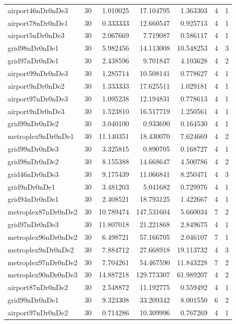 \documentclass[../../../thesis.tex]{subfiles}
\begin{document}
\begin{longtable}{|l|r|r|r|r|r|r|}
airport46nDr0nDe3 & 30 & 1.010025 & 17.104795 & 1.363303 & 4 & 1 \\
airport78nDr0nDe1 & 30 & 0.333333 & 12.660547 & 0.925713 & 4 & 1 \\
airport5nDr0nDe3 & 30 & 2.067669 & 7.719087 & 0.586117 & 4 & 1 \\
grid98nDr0nDe1 & 30 & 5.982456 & 14.113008 & 10.548253 & 4 & 3 \\
grid97nDr0nDe1 & 30 & 2.438596 & 9.701847 & 4.103628 & 4 & 2 \\
airport99nDr0nDe3 & 30 & 1.285714 & 10.508141 & 0.778627 & 4 & 1 \\
airport9nDr0nDe2 & 30 & 1.333333 & 17.625511 & 1.029181 & 4 & 1 \\
airport97nDr0nDe3 & 30 & 1.095238 & 12.194831 & 0.778613 & 4 & 1 \\
airport9nDr0nDe3 & 30 & 1.523810 & 16.517719 & 1.250561 & 4 & 1 \\
grid99nDr0nDe2 & 30 & 3.040100 & 0.933690 & 0.164530 & 4 & 1 \\
metroplex9nDr0nDe1 & 30 & 11.140351 & 18.430070 & 7.624669 & 4 & 2 \\
grid99nDr0nDe3 & 30 & 3.325815 & 0.890705 & 0.168727 & 4 & 1 \\
grid98nDr0nDe2 & 30 & 8.155388 & 14.668647 & 4.500786 & 4 & 2 \\
grid46nDr0nDe3 & 30 & 9.175439 & 11.066841 & 8.250471 & 4 & 3 \\
grid9nDr0nDe1 & 30 & 3.481203 & 5.041682 & 0.729976 & 4 & 1 \\
grid94nDr0nDe1 & 30 & 2.408521 & 18.793125 & 1.422667 & 4 & 1 \\
metroplex87nDr0nDe2 & 30 & 10.789474 & 147.531604 & 5.660034 & 7 & 2 \\
grid97nDr0nDe3 & 30 & 11.807018 & 21.221868 & 2.849675 & 4 & 1 \\
metroplex96nDr0nDe2 & 30 & 6.498721 & 57.166705 & 2.046107 & 7 & 1 \\
metroplex9nDr0nDe2 & 30 & 7.884712 & 27.668918 & 19.113732 & 4 & 3 \\
metroplex97nDr0nDe2 & 30 & 7.704261 & 54.467590 & 11.843228 & 7 & 2 \\
metroplex90nDr0nDe3 & 30 & 14.887218 & 129.773307 & 61.989207 & 4 & 2 \\
airport87nDr0nDe2 & 30 & 2.548872 & 11.192775 & 0.559492 & 4 & 1 \\
grid99nDr0nDe1 & 30 & 9.323308 & 33.209342 & 8.001550 & 6 & 2 \\
airport97nDr0nDe2 & 30 & 0.714286 & 10.309996 & 0.767269 & 4 & 1 \\

\end{longtable}
\end{document}
